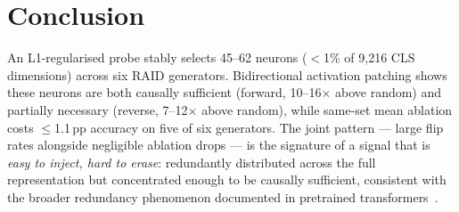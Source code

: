 \documentclass[11pt]{article}
\begin{document}
\begin{table}[t]
\centering
{}
\caption{Leave-one-family-out (LOGO) generalisation.
$n_{\text{stable}}$: stable neurons identified from the four training families.
Full\,L2: L2-probe accuracy using all 9{,}216 BERT neurons.
Sel\,L2: L2-probe accuracy restricted to $n_{\text{stable}}$ neurons.
Sel/Full: ratio expressing how much of the full-feature ceiling the selected
neurons retain.
Full AUC: area under the ROC curve (AUC) for the full-feature L2 probe.
Sel AUC: AUC for the Sel\,L2 probe, ranging from 0.863 (cohere) to 0.986 (llama).
All metrics are means over 3 seeds $\times$ 5 folds = 15 cells.
Test set sizes: 5{,}000 (llama, 1 generator) to 20{,}000 (gpt, 4 generators).}
\label{tab:logo}
\end{table}

\section{Conclusion}
\label{sec:conclusion}

An L1-regularised probe stably selects 45--62 neurons ($<$1\% of 9{,}216 CLS dimensions) across six RAID generators. Bidirectional activation patching shows these neurons are both causally sufficient (forward, 10--16$\times$ above random) and partially necessary (reverse, 7--12$\times$ above random), while same-set mean ablation costs $\leq$1.1\,pp accuracy on five of six generators. The joint pattern --- large flip rates alongside negligible ablation drops --- is the signature of a signal that is \textit{easy to inject, hard to erase}: redundantly distributed across the full representation but concentrated enough to be causally sufficient, consistent with the broader redundancy phenomenon documented in pretrained transformers~\citep{dalvi2020redundancy}.
\end{document}
